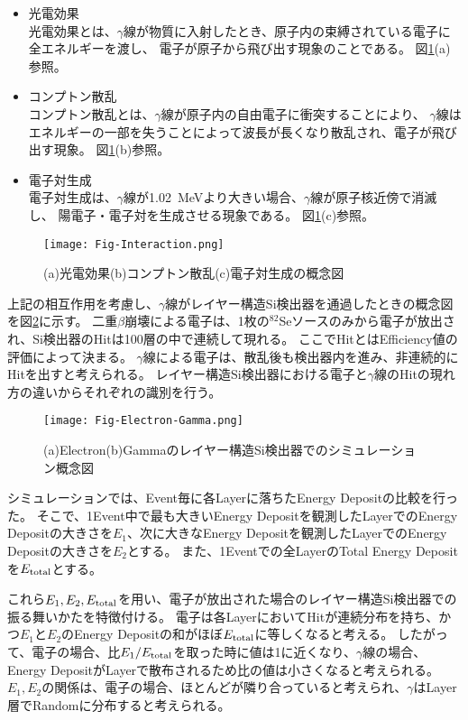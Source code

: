 \documentclass[a4paper,10pt]{jreport}
\begin{document}
\begin{itemize}
	\item 光電効果 \\
	光電効果とは、$\gamma$線が物質に入射したとき、原子内の束縛されている電子に全エネルギーを渡し、
	電子が原子から飛び出す現象のことである。
	図\ref{Fig-Interaction}(a)参照。
	
	\item コンプトン散乱 \\
	コンプトン散乱とは、$\gamma$線が原子内の自由電子に衝突することにより、
	$\gamma$線はエネルギーの一部を失うことによって波長が長くなり散乱され、電子が飛び出す現象。
	図\ref{Fig-Interaction}(b)参照。
	
	\item 電子対生成 \\
	電子対生成は、$\gamma$線が\SI{1.02}{MeV}より大きい場合、$\gamma$線が原子核近傍で消滅し、
	陽電子・電子対を生成させる現象である。
	図\ref{Fig-Interaction}(c)参照。
\end{itemize}

\begin{figure}[H]
	\center
	\texttt{[image: Fig-Interaction.png]}
	\caption{(a)光電効果(b)コンプトン散乱(c)電子対生成の概念図} \label{Fig-Interaction}
\end{figure}

上記の相互作用を考慮し、$\gamma$線がレイヤー構造Si検出器を通過したときの概念図を図\ref{Fig-Electron-Gamma}に示す。
二重$\beta$崩壊による電子は、1枚の$^{82}$Seソースのみから電子が放出され、Si検出器のHitは100層の中で連続して現れる。
ここでHitとはEfficiency値の評価によって決まる。
$\gamma$線による電子は、散乱後も検出器内を進み、非連続的にHitを出すと考えられる。
レイヤー構造Si検出器における電子と$\gamma$線のHitの現れ方の違いからそれぞれの識別を行う。

\begin{figure}[H]
	\center
	\texttt{[image: Fig-Electron-Gamma.png]}
	\caption{(a)Electron(b)Gammaのレイヤー構造Si検出器でのシミュレーション概念図} \label{Fig-Electron-Gamma}
\end{figure}

シミュレーションでは、Event毎に各Layerに落ちたEnergy Depositの比較を行った。
そこで、1Event中で最も大きいEnergy Depositを観測したLayerでのEnergy Depositの大きさを$E_1$、次に大きなEnergy Depositを観測したLayerでのEnergy Depositの大きさを$E_2$とする。
また、1Eventでの全LayerのTotal Energy Depositを$E_{\rm{total}}$とする。

これら$E_1,E_2,E_{\rm{total}}$を用い、電子が放出された場合のレイヤー構造Si検出器での振る舞いかたを特徴付ける。
電子は各LayerにおいてHitが連続分布を持ち、かつ$E_1$と$E_2$のEnergy Depositの和がほぼ$E_{\rm{total}}$に等しくなると考える。
したがって、電子の場合、比$E_1/E_{\rm{total}}$を取った時に値は1に近くなり、$\gamma$線の場合、Energy DepositがLayerで散布されるため比の値は小さくなると考えられる。
$E_1,E_2$の関係は、電子の場合、ほとんどが隣り合っていると考えられ、$\gamma$はLayer層でRandomに分布すると考えられる。
\end{document}
